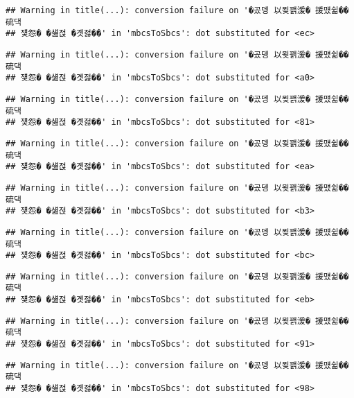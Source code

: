 \documentclass[
]{article}
\begin{document}
\begin{verbatim}
## Warning in title(...): conversion failure on '�곴뎅 以묒꽭湲� 援먰쉶�� 硫댁
## 쟻怨� �섎젅 �곗젏��' in 'mbcsToSbcs': dot substituted for <ec>
\end{verbatim}

\begin{verbatim}
## Warning in title(...): conversion failure on '�곴뎅 以묒꽭湲� 援먰쉶�� 硫댁
## 쟻怨� �섎젅 �곗젏��' in 'mbcsToSbcs': dot substituted for <a0>
\end{verbatim}

\begin{verbatim}
## Warning in title(...): conversion failure on '�곴뎅 以묒꽭湲� 援먰쉶�� 硫댁
## 쟻怨� �섎젅 �곗젏��' in 'mbcsToSbcs': dot substituted for <81>
\end{verbatim}

\begin{verbatim}
## Warning in title(...): conversion failure on '�곴뎅 以묒꽭湲� 援먰쉶�� 硫댁
## 쟻怨� �섎젅 �곗젏��' in 'mbcsToSbcs': dot substituted for <ea>
\end{verbatim}

\begin{verbatim}
## Warning in title(...): conversion failure on '�곴뎅 以묒꽭湲� 援먰쉶�� 硫댁
## 쟻怨� �섎젅 �곗젏��' in 'mbcsToSbcs': dot substituted for <b3>
\end{verbatim}

\begin{verbatim}
## Warning in title(...): conversion failure on '�곴뎅 以묒꽭湲� 援먰쉶�� 硫댁
## 쟻怨� �섎젅 �곗젏��' in 'mbcsToSbcs': dot substituted for <bc>
\end{verbatim}

\begin{verbatim}
## Warning in title(...): conversion failure on '�곴뎅 以묒꽭湲� 援먰쉶�� 硫댁
## 쟻怨� �섎젅 �곗젏��' in 'mbcsToSbcs': dot substituted for <eb>
\end{verbatim}

\begin{verbatim}
## Warning in title(...): conversion failure on '�곴뎅 以묒꽭湲� 援먰쉶�� 硫댁
## 쟻怨� �섎젅 �곗젏��' in 'mbcsToSbcs': dot substituted for <91>
\end{verbatim}

\begin{verbatim}
## Warning in title(...): conversion failure on '�곴뎅 以묒꽭湲� 援먰쉶�� 硫댁
## 쟻怨� �섎젅 �곗젏��' in 'mbcsToSbcs': dot substituted for <98>
\end{verbatim}
\end{document}
